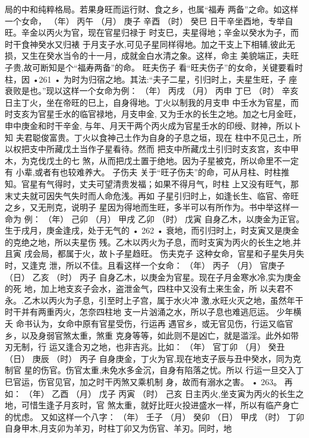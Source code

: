 局的中和纯粹格局。若果身旺而运行财、食之乡，也属“福寿
两备”之命。如这样一个女命，
（年） 丙午
（月） 庚子
辛酉
（时） 癸巳
日干辛坐酉地，专举自旺。辛金以丙火为官，现在官星归禄于
时支巳，夫星得地；辛金以癸水为子，而时干食神癸水又归裱
于月支子水,可见子星同样得地。加之干支上下相辅,彼此无
损，又生在癸水当令的十一月，成就金白水清之象。这样，命主
美貌端正，夫旺子贵,故可断知是个“福寿两备”的命。
旺夫伤子 看“旺夫伤子”的女命，关键要看时柱，因
•261 •
为时为归宿之地。其法:“夫子二星，引归时上，夫星生旺，子
座衰败是也。”现以这样一个女命为例：
（年） 丙戌
（月） 丙申
丁巳
（时） 辛亥
日主丁火，坐在帝旺的巳上，自身得地。丁火以制我的月支申
中壬水为官星，而时支亥为官星壬水的临官禄地，月支申金,
又为壬水的长生之地。加之七月金旺，申中庚金和时干辛金,
与年、月天干两个丙火成为官星壬水的印绶、财神，所以卜知
夫君聪俊富贵。丁火以食神己土作为自身的子息之垣，现在
柱中不见己土，所以权把支中所藏戊土当作子星看待。然而
把支中所藏戊土引归时支亥宫，亥中甲木，为克伐戊土的七
煞，从而把戊土置于绝地。因为子星被克，所以命里不一定有
小辈,或者有也较难养大。
子伤夫 关于“旺子伤夫”的命，可从月柱、时柱推
知。官星有气得时，丈夫可望清贵发福；如果不得月气，时柱
上又没有旺气，那末丈夫就可因失气失时而人命危浅。再如
子星引归时上，如逢长生、临官、帝旺之乡，又无刑克，说明子
星因为得地而生旺，多半可以有所作为。书中举这样一命为
例：
（年） 己卯
（月） 甲戌
乙卯
（时） 戊寅
自身乙木，以庚金为正官。生于戌月，庚金逢戌，处于无气的
• 262 •
衰地，而引归时上，时支寅又是庚金的克绝之地，所以夫星伤
残。乙木以丙火为子息，而时支寅为丙火的长生之地,并且寅
戌会局，都属于火，故卜子星趋旺。
伤夫克子 这种女命，官星和子星失月失时，又逢克
泄，所以不佳。且看这样一个女命：
（年） 丙子
（月） 官庚子
（日） 乙亥
（时） 丙子
自身乙木，以庚金为官星。现在子月金寒水冷,实为庚金的死
地，加上地支亥子会水，盗泄金气，四柱中又没有土来生金，所
以夫君不永。.乙木以丙火为子息，引至时上子宫，属于水火冲
激,水旺火灭之地，虽然年干时干并有两重丙火，怎奈四柱地
支一片汹涌之水，所以子息也难逃厄运。
少年横夭 命书认为，女命中原有官星受伤，行运再
遇官乡，或无官见伤，行运又临官乡，以及身弱官煞太重，煞重
克身等等，如此则不是凶亡，就是滥淫。此外如带刃无制，行
运又逢合刃之地，也非吉兆。比如：
（年） 官丁卯
（月） 癸丑
（日） 庚辰
（时） 丙子
自身庚金，丁火为官,现在地支子辰与丑中癸水，同为克制官
星的伤官。伤官太重,未免水多金沉，自身有陷落之忧。所以
行运一旦交入丁巳官运，伤官见官，加之时干丙煞又乘机制
身，故而有溺水之害。
• 263。
再如：
（年） 乙酉
（月） 戊子
丙寅
（时） 己亥
日主丙火,坐支寅为丙火的长生之地，可惜生逢子月亥时，官
煞太重，就好比旺火投进盛水一样，所以有临产身亡的忧虑。
又如这样一个八字：
（年） 壬子
（月） 癸卯
（日） 甲戌
（时） 丁卯
自身甲木,月支卯为羊刃，时柱丁卯又为伤官、羊刃。同时，地
